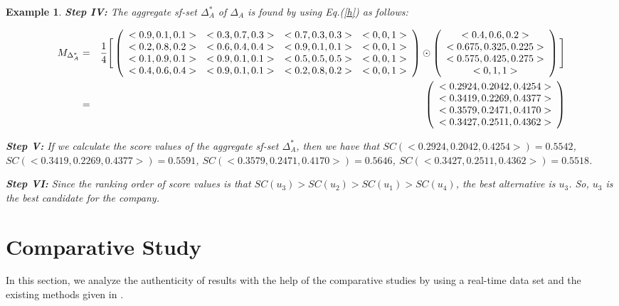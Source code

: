 \documentclass{IJFS}
\newtheorem{ex}[theorem]{Example}
\begin{document}
\begin{ex}
\textbf{Step IV:} The aggregate sf-set $\Delta_A^*$ of $\Delta_A$
is found by using Eq.(\ref{h}) as follows:
\begin{center}
\begin{eqnarray*}
 M_{\Delta_A^*}&=&\frac{1}{4}\Bigg[\left(
\begin{array}{c c c c}
<0.9,0.1,0.1> &<0.3,0.7,0.3>&<0.7, 0.3, 0.3>&<0,0,1>\\
<0.2, 0.8,0.2>&<0.6, 0.4,0.4>&<0.9,0.1, 0.1>&<0,0,1>\\
 <0.1, 0.9, 0.1>&<0.9, 0.1,0.1>&<0.5, 0.5, 0.5>&<0,0,1>\\
 <0.4, 0.6, 0.4>&<0.9, 0.1, 0.1>&<0.2, 0.8,
 0.2>&<0,0,1> \end{array}\right) \odot \left(
\begin{array}{c}
<0.4, 0.6, 0.2>  \\
<0.675, 0.325, 0.225>\\
<0.575, 0.425, 0.275> \\
<0,  1, 1>
\end{array} \right)\Bigg]
\\ &=& \left(
\begin{array}{c}
<0.2924,  0.2042,  0.4254> \\<0.3419,  0.2269,  0.4377> \\<0.3579,
0.2471, 0.4170> \\<0.3427,  0.2511,  0.4362>
\end{array} \right)
\end{eqnarray*}
\end{center}

\textbf{Step V:} If we calculate the score values of the
aggregate sf-set $\Delta_A^*$, then we have that \linebreak[4] $SC(<0.2924,
0.2042,  0.4254>)=0.5542$, $SC(<0.3419,  0.2269,  0.4377>)=0.5591
$, \linebreak[4] $SC(<0.3579, 0.2471, 0.4170>)=0.5646 $, $SC(<0.3427,  0.2511,
0.4362>)=0.5518$.

\textbf{Step VI:} Since the ranking order of score values is that 
$SC(u_3)>SC(u_2)>SC(u_1)>SC(u_4)$, the best alternative is $u_3$.
So, $u_3$ is the best candidate for the company.
\end{ex}


\section{Comparative Study}
In this section, we analyze the authenticity of results with the help of the comparative studies by using a real-time data set and the existing methods given in \cite{ah, gul, per, yang}.
\end{document}

